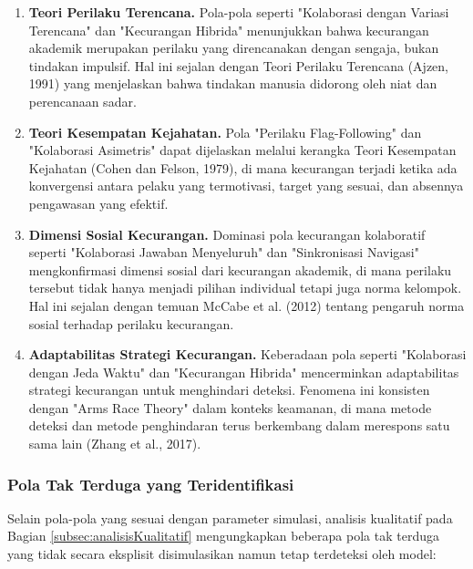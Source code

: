 \begin{enumerate}
    \item \textbf{Teori Perilaku Terencana.} Pola-pola seperti "Kolaborasi dengan Variasi Terencana" dan "Kecurangan Hibrida" menunjukkan bahwa kecurangan akademik merupakan perilaku yang direncanakan dengan sengaja, bukan tindakan impulsif. Hal ini sejalan dengan Teori Perilaku Terencana (Ajzen, 1991) yang menjelaskan bahwa tindakan manusia didorong oleh niat dan perencanaan sadar.
    
    \item \textbf{Teori Kesempatan Kejahatan.} Pola "Perilaku Flag-Following" dan "Kolaborasi Asimetris" dapat dijelaskan melalui kerangka Teori Kesempatan Kejahatan (Cohen dan Felson, 1979), di mana kecurangan terjadi ketika ada konvergensi antara pelaku yang termotivasi, target yang sesuai, dan absennya pengawasan yang efektif.
    
    \item \textbf{Dimensi Sosial Kecurangan.} Dominasi pola kecurangan kolaboratif seperti "Kolaborasi Jawaban Menyeluruh" dan "Sinkronisasi Navigasi" mengkonfirmasi dimensi sosial dari kecurangan akademik, di mana perilaku tersebut tidak hanya menjadi pilihan individual tetapi juga norma kelompok. Hal ini sejalan dengan temuan McCabe et al. (2012) tentang pengaruh norma sosial terhadap perilaku kecurangan.
    
    \item \textbf{Adaptabilitas Strategi Kecurangan.} Keberadaan pola seperti "Kolaborasi dengan Jeda Waktu" dan "Kecurangan Hibrida" mencerminkan adaptabilitas strategi kecurangan untuk menghindari deteksi. Fenomena ini konsisten dengan "Arms Race Theory" dalam konteks keamanan, di mana metode deteksi dan metode penghindaran terus berkembang dalam merespons satu sama lain (Zhang et al., 2017).
\end{enumerate}

\subsubsection{Pola Tak Terduga yang Teridentifikasi}

Selain pola-pola yang sesuai dengan parameter simulasi, analisis kualitatif pada Bagian \ref{subsec:analisisKualitatif} mengungkapkan beberapa pola tak terduga yang tidak secara eksplisit disimulasikan namun tetap terdeteksi oleh model:


